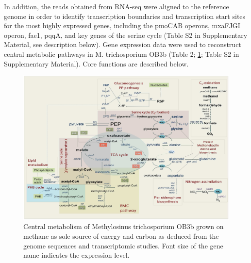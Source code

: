 In addition, the reads obtained from RNA-seq were aligned to the reference genome in order to identify transcription boundaries and transcription start sites for the most highly expressed genes, including the pmoCAB operons, mxaFJGI operon, fae1, pqqA, and key genes of the serine cycle (Table S2 in Supplementary Material, see description below).
Gene expression data were used to reconstruct central metabolic pathways in M. trichosporium OB3b (Table 2; \ref{fig:A_metabolic_map}; Table S2 in Supplementary Material).
Core functions are described below.


\begin{figure}[H]
\centering
     \includegraphics[width=1.0\textwidth]{./tex/chapter1/figures/figure1.png}
     \begin{singlespace}
     \caption{Central metabolism of Methylosinus trichosporium OB3b grown on methane as sole source of energy and carbon as
        deduced from the genome sequences and transcriptomic studies.
        Font size of the gene name indicates the expression level.}
     \label{fig:A_metabolic_map}
     \end{singlespace}
\end{figure}

